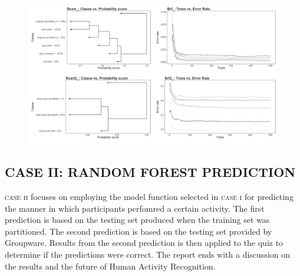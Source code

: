 \documentclass[10pt, twoside]{article}
\begin{document}
\begin{figure}[H]
\centering
\includegraphics[scale=0.359]{plot2}
\caption{}
\end{figure}


\newpage

\begin{center}
\section{CASE II: RANDOM FOREST PREDICTION}
\vspace{-3ex}
\end{center}

\noindent
\textsc{case ii} focuses on employing the model function selected in \textsc{case i} for predicting the manner
in which participants perfomred a certain activity. The first prediction is based on the
testing set produced when the training set was partitioned. The second prediction is based on
the testing set provided by Groupware. Results from the second prediction is then applied to
the quiz to determine if the predictions were correct. The report ends with a 
discussion on the results and the future of Human Activity Recognition.
\bigskip
\end{document}
